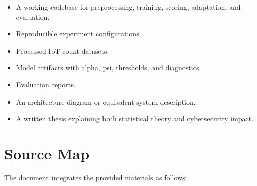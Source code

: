 \documentclass[11pt,a4paper]{article}
\begin{document}
\begin{itemize}
  \item A working codebase for preprocessing, training, scoring, adaptation, and evaluation.
  \item Reproducible experiment configurations.
  \item Processed IoT count datasets.
  \item Model artifacts with alpha, psi, thresholds, and diagnostics.
  \item Evaluation reports.
  \item An architecture diagram or equivalent system description.
  \item A written thesis explaining both statistical theory and cybersecurity impact.
\end{itemize}

\section*{Source Map}

The document integrates the provided materials as follows:
\end{document}
